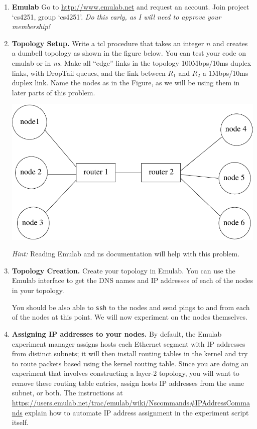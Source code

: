 \documentclass[11pt]{article}
\begin{document}
\begin{enumerate}
\itemsep=-1pt
\item{\bf Emulab} Go to \url{http://www.emulab.net} and request an
  account. Join project `cs4251, group `cs4251'.  {\em Do this early, as
    I will need to approve your membership!}

\item{\bf Topology Setup.} Write a tcl procedure that takes an integer
  $n$ and creates a dumbell topology as shown in the figure below.  You
  can test your code on emulab or in {\em ns}.  Make all ``edge'' links
  in the topology 100Mbps/10ms duplex links, with DropTail queues, and
  the link between $R_1$ and $R_2$ a 1Mbps/10ms duplex link. Name the
  nodes as in the Figure, as we will be using them in later parts of
  this problem.

\begin{center}
\includegraphics[width=0.5\linewidth]{db}
\end{center}

  {\em Hint:} Reading Emulab and ns documentation will help with this
  problem.

\item {\bf Topology Creation.} Create your topology in Emulab.  You
  can use the Emulab interface to get the DNS names and IP addresses of
  each of the nodes in your topology.  

  You should be also able to {\tt ssh} to the nodes and send pings to
  and from each of the nodes at this point.  We will now experiment on
  the nodes themselves.

\item {\bf Assigning IP addresses to your nodes.} By default, the Emulab
  experiment manager assigns hosts each Ethernet segment with IP
  addresses from distinct subnets; it will then install routing tables
  in the kernel and try to route packets based using the kernel routing
  table.  Since you are doing an experiment that involves constructing a
  layer-2 topology, you will want to remove these routing table entries,
  assign hosts IP addresses from the same subnet, or both.  The
  instructions at
  \url{https://users.emulab.net/trac/emulab/wiki/Nscommands#IPAddressCommands}
  explain how to automate IP address assignment in the experiment script
  itself.  

\end{enumerate}
\end{document}
